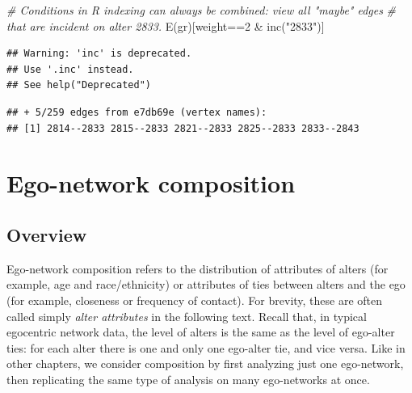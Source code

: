 \documentclass[
]{book}
\newenvironment{Shaded}{\begin{snugshade}}{\end{snugshade}}
\newcommand{\CommentTok}[1]{\textcolor[rgb]{0.56,0.35,0.01}{\textit{#1}}}
\newcommand{\DecValTok}[1]{\textcolor[rgb]{0.00,0.00,0.81}{#1}}
\newcommand{\FunctionTok}[1]{\textcolor[rgb]{0.00,0.00,0.00}{#1}}
\newcommand{\NormalTok}[1]{#1}
\newcommand{\SpecialCharTok}[1]{\textcolor[rgb]{0.00,0.00,0.00}{#1}}
\newcommand{\StringTok}[1]{\textcolor[rgb]{0.31,0.60,0.02}{#1}}
\begin{document}
\begin{Shaded}
\begin{Highlighting}[]
\CommentTok{\# Conditions in R indexing can always be combined: view all "maybe" edges}
\CommentTok{\# that are incident on alter 2833.}
\FunctionTok{E}\NormalTok{(gr)[weight}\SpecialCharTok{==}\DecValTok{2} \SpecialCharTok{\&} \FunctionTok{inc}\NormalTok{(}\StringTok{"2833"}\NormalTok{)]}
\end{Highlighting}
\end{Shaded}

\begin{verbatim}
## Warning: 'inc' is deprecated.
## Use '.inc' instead.
## See help("Deprecated")
\end{verbatim}

\begin{verbatim}
## + 5/259 edges from e7db69e (vertex names):
## [1] 2814--2833 2815--2833 2821--2833 2825--2833 2833--2843
\end{verbatim}

\begin{Shaded}
\end{Shaded}

\hypertarget{composition}{%
\chapter{Ego-network composition}\label{composition}}

\hypertarget{overview-2}{%
\section{Overview}\label{overview-2}}

Ego-network composition refers to the distribution of attributes of alters (for example, age and race/ethnicity) or attributes of ties between alters and the ego (for example, closeness or frequency of contact). For brevity, these are often called simply \emph{alter attributes} in the following text. Recall that, in typical egocentric network data, the level of alters is the same as the level of ego-alter ties: for each alter there is one and only one ego-alter tie, and vice versa. Like in other chapters, we consider composition by first analyzing just one ego-network, then replicating the same type of analysis on many ego-networks at once.
\end{document}
